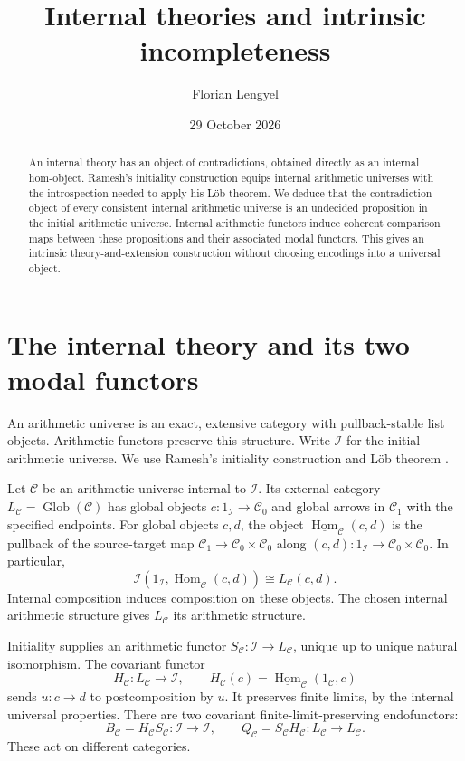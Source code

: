 \documentclass[10pt]{article}
\title{Internal theories and intrinsic incompleteness}
\author{Florian Lengyel}
\date{29 October 2026}
\newcommand{\I}{\mathcal I}
\newcommand{\C}{\mathcal C}
\newcommand{\Glob}{\operatorname{Glob}}
\newcommand{\hhom}{\underline{\operatorname{Hom}}}
\begin{document}
\maketitle
\begin{abstract}
An internal theory has an object of contradictions, obtained directly
as an internal hom-object. Ramesh's initiality construction equips
internal arithmetic universes with the introspection needed to apply
his L\"ob theorem. We deduce that the contradiction object of every
consistent internal arithmetic universe is an undecided proposition
in the initial arithmetic universe. Internal arithmetic functors
induce coherent comparison maps between these propositions and their
associated modal functors. This gives an intrinsic theory-and-extension
construction without choosing encodings into a universal object.
\end{abstract}

\section{The internal theory and its two modal functors}

An arithmetic universe is an exact, extensive category with
pullback-stable list objects. Arithmetic functors preserve this
structure. Write $\I$ for the initial arithmetic universe.
We use Ramesh's initiality construction and L\"ob theorem
\cite[Construction~6.11 and Theorem~4.19]{Ramesh}.

Let $\C$ be an arithmetic universe internal to $\I$.
Its external category $L_\C=\Glob(\C)$ has global objects
$c:1_\I\to\C_0$ and global arrows in $\C_1$ with the specified
endpoints. For global objects $c,d$, the object
$\hhom_\C(c,d)$ is the pullback of the source-target map
$\C_1\to\C_0\times\C_0$ along $(c,d):1_\I\to\C_0\times\C_0$.
In particular,
\begin{equation}\label{eq:global-hom}
 \I(1_\I,\hhom_\C(c,d))\cong L_\C(c,d).
\end{equation}
Internal composition induces composition on these objects.
The chosen internal arithmetic structure gives $L_\C$ its
arithmetic structure.

Initiality supplies an arithmetic functor
$S_\C:\I\to L_\C$, unique up to unique natural isomorphism.
The covariant functor
\[
 H_\C:L_\C\longrightarrow\I,
 \qquad H_\C(c)=\hhom_\C(1_\C,c)
\]
sends $u:c\to d$ to postcomposition by $u$.
It preserves finite limits, by the internal universal properties.
There are two covariant finite-limit-preserving endofunctors:
\begin{equation}\label{eq:two-boxes}
 B_\C=H_\C S_\C:\I\to\I,
 \qquad Q_\C=S_\C H_\C:L_\C\to L_\C.
\end{equation}
These act on different categories.
\end{document}
